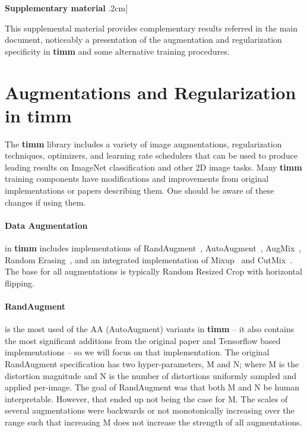 

\appendix\newpage

\onecolumn


\begin{center}
{\LARGE
\textbf{Supplementary material} \0.2cm]}

\vspace{0.5cm} \end{center}

This supplemental material provides complementary results referred in the main document, noticeably a presentation of the augmentation and regularization specificity in \textbf{timm} and some alternative training procedures.

 \FloatBarrier
 




\FloatBarrier


\section{Augmentations and Regularization in timm~\cite{pytorchmodels}}
\label{sec:augreg}

The \textbf{timm} library includes a variety of image augmentations, regularization techniques, optimizers, and learning rate schedulers that can be used to produce leading results on ImageNet classification and other 2D image tasks. Many \textbf{timm} training components have modifications and improvements from original implementations or papers describing them. One should be aware of these changes if using them. 

\paragraph{Data Augmentation} in \textbf{timm} includes implementations of RandAugment~\cite{Cubuk2019RandAugmentPA}, AutoAugment~\cite{Ekin2018AutoAugment}, AugMix~\cite{Hendrycks2020AugMixAS}, Random Erasing~\cite{Zhong2020RandomED}, and an integrated implementation of Mixup~\cite{Zhang2017Mixup} and CutMix~\cite{Yun2019CutMix}. The base for all augmentations is typically Random Resized Crop with horizontal flipping. 

\paragraph{RandAugment} is the most used of the AA (AutoAugment) variants in \textbf{timm} -- it also contains the most significant additions from the original paper and Tensorflow based implementations – so we will focus on that implementation. The original RandAugment specification has two hyper-parameters, M and N; where M is the distortion magnitude and N is the number of distortions uniformly sampled and applied per-image. The goal of RandAugment was that both M and N be human interpretable. However, that ended up not being the case for M. The scales of several augmentations were backwards or not monotonically increasing over the range such that increasing M does not increase the strength of all augmentations.

